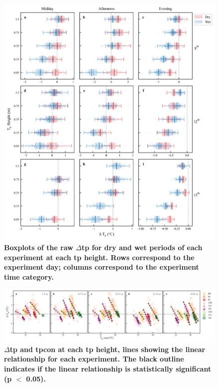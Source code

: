 \documentclass[final,3p,times,authoryear]{elsarticle}
\begin{document}
\begin{figure}
\centering
\includegraphics[trim={0 0 0 0},clip,scale=1.0]{temp_profile_box_plot_raw.png}
\caption{\bf Boxplots of the raw $\Delta$\gls{tp} for dry and wet periods of each experiment at each \gls{tp} height. Rows correspond to the experiment day; columns correspond to the experiment time category.}
 \label{fig:7.9}
\end{figure}


\begin{figure}
\centering
\includegraphics[trim={0 0 0 0},clip,scale=0.7]{control_differences_relationship.png}
\caption{\bf $\Delta$\gls{tp} and \gls{tpcon} at each \gls{tp} height, lines showing the linear relationship for each experiment. The black outline indicates if the linear relationship is statistically significant (\gls{p} $<$ 0.05).}
 \label{fig:7.10}
\end{figure}
\end{document}
